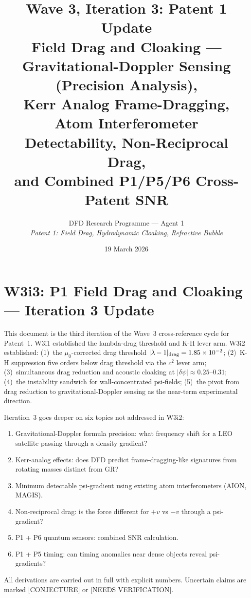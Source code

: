 \documentclass[11pt,twocolumn]{article}
\title{Wave 3, Iteration 3: Patent 1 Update\\
Field Drag and Cloaking ---\\
Gravitational-Doppler Sensing (Precision Analysis),\\
Kerr Analog Frame-Dragging, Atom Interferometer\\
Detectability, Non-Reciprocal Drag,\\
and Combined P1/P5/P6 Cross-Patent SNR}
\author{DFD Research Programme --- Agent 1\\
\textit{Patent 1: Field Drag, Hydrodynamic Cloaking, Refractive Bubble}}
\date{19 March 2026}
\newcommand{\dpsi}{\delta\psi}
\newcommand{\lam}{\lambda}
\begin{document}
\maketitle

\section*{W3i3: P1 Field Drag and Cloaking --- Iteration 3 Update}

\noindent This document is the third iteration of the Wave~3 cross-reference
cycle for Patent~1. W3i1 established the lambda-drag threshold and K-H
lever arm. W3i2 established: (1)~the $\mu_0$-corrected drag threshold
$|\lam-1|_{\rm drag} = 1.85\times10^{-2}$; (2)~K-H suppression five orders
below drag threshold via the $c^2$ lever arm; (3)~simultaneous drag reduction
and acoustic cloaking at $|\dpsi|\approx0.25$--$0.31$; (4)~the instability
sandwich for wall-concentrated psi-fields; (5)~the pivot from drag reduction
to gravitational-Doppler sensing as the near-term experimental direction.

Iteration~3 goes deeper on six topics not addressed in W3i2:
\begin{enumerate}[nosep]
\item Gravitational-Doppler formula precision: what frequency shift for a
  LEO satellite passing through a density gradient?
\item Kerr-analog effects: does DFD predict frame-dragging-like signatures
  from rotating masses distinct from GR?
\item Minimum detectable psi-gradient using existing atom interferometers
  (AION, MAGIS).
\item Non-reciprocal drag: is the force different for $+v$ vs $-v$ through
  a psi-gradient?
\item P1 + P6 quantum sensors: combined SNR calculation.
\item P1 + P5 timing: can timing anomalies near dense objects reveal
  psi-gradients?
\end{enumerate}

All derivations are carried out in full with explicit numbers.
Uncertain claims are marked
\textcolor{conjecturecolor}{[CONJECTURE]} or
\textcolor{errorcolor}{[NEEDS VERIFICATION]}.

\end{document}

